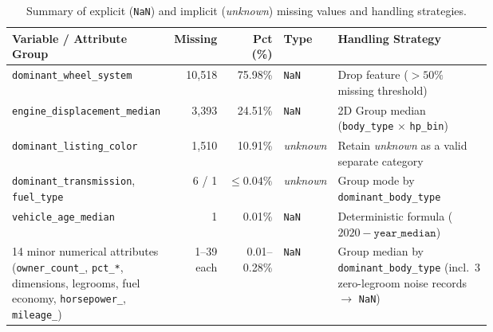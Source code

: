 \begin{table}[htbp]
  \centering
  \caption{Summary of explicit (\texttt{NaN}) and implicit (\emph{unknown}) missing values and handling strategies.}
  \label{tab:missing}
  \footnotesize
  \renewcommand{\arraystretch}{0.95}
  \begin{tabular}{p{0.34\linewidth}rrlp{0.36\linewidth}}
    \toprule
    \textbf{Variable / Attribute Group} & \textbf{Missing} & \textbf{Pct (\%)} & \textbf{Type} & \textbf{Handling Strategy} \\
    \midrule
    \texttt{dominant\_wheel\_system} & 10,518 & 75.98\% & \texttt{NaN} & Drop feature ($>50\%$ missing threshold) \\
    \texttt{engine\_displacement\_median} & 3,393 & 24.51\% & \texttt{NaN} & 2D Group median (\texttt{body\_type} $\times$ \texttt{hp\_bin}) \\
    \texttt{dominant\_listing\_color} & 1,510 & 10.91\% & \emph{unknown} & Retain \emph{unknown} as a valid separate category \\
    \texttt{dominant\_transmission}, \texttt{fuel\_type} & 6 / 1 & $\le 0.04\%$ & \emph{unknown} & Group mode by \texttt{dominant\_body\_type} \\
    \texttt{vehicle\_age\_median} & 1 & 0.01\% & \texttt{NaN} & Deterministic formula ($2020 - \texttt{year\_median}$) \\
    14 minor numerical attributes (\texttt{owner\_count\_}, \texttt{pct\_*}, dimensions, legrooms, fuel economy, \texttt{horsepower\_}, \texttt{mileage\_}) & 1--39 each & 0.01--0.28\% & \texttt{NaN} & Group median by \texttt{dominant\_body\_type} (incl.\ 3 zero-legroom noise records $\rightarrow$ \texttt{NaN}) \\
    \bottomrule
  \end{tabular}
\end{table}

